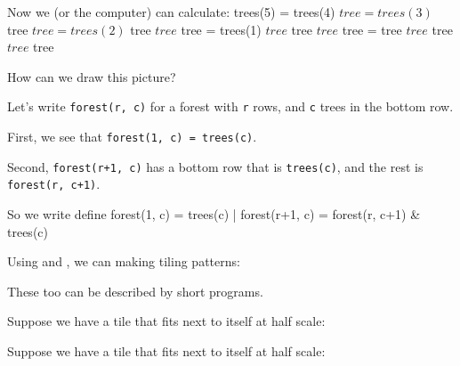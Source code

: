 Now we (or the computer) can calculate:
\verbatim
trees(5) = trees(4) $ tree
  = trees(3) $ tree $ tree
  = trees(2) $ tree $ tree $ tree
  = trees(1) $ tree $ tree $ tree $ tree
  = tree $ tree $ tree $ tree $ tree
\endverb
\medskip
\centerline{}

%> bigpic(13, trees(5));


%> define forest(1, c) = trees(c)
%>   | forest(r+1, c) = forest(r, c+1) & trees(c);

%> bigpic(14, forest(10, 10));

How can we draw this picture?
\medskip
\centerline{}


Let's write \verb/forest(r, c)/ for a forest with \verb/r/ rows,
and \verb/c/ trees in the bottom row.

\item First, we see that \verb/forest(1, c) = trees(c)/.

\item Second, \verb/forest(r+1, c)/ has a bottom row that is
\verb/trees(c)/, and the rest is \verb/forest(r, c+1)/.

So we write
\verbatim
define forest(1, c) = trees(c)
  | forest(r+1, c) = 
      forest(r, c+1) & trees(c)
\endverb



%> pic(15, forest(2, 2));
%> pic(16, forest(4, 6));
%> medpic(17, forest(20, 20));


Using  and , we can making tiling patterns:
\bigskip
\centerline{\hfil{}}
\medskip
These too can be described by short programs.



Suppose we have a tile that fits next to itself at half scale:




Suppose we have a tile that fits next to itself at half scale:

